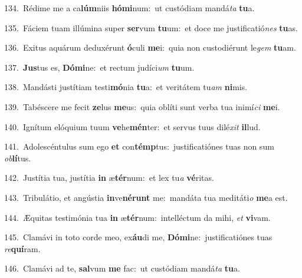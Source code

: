 {\numbfont\textcolor{\numbcolor}{134.}}~Rédime me a ca\-\textbf{lúm}\-niis \textbf{hó}\-\textbf{mi}num:~\star ut custódiam mandá\textit{ta} \textbf{tu}\-a.\par
{\numbfont\textcolor{\numbcolor}{135.}}~Fáciem tuam illúmina super \textbf{ser}\-vum \textbf{tu}\-um:~\star et doce me justificatió\textit{nes} \textbf{tu}\-as.\par
{\numbfont\textcolor{\numbcolor}{136.}}~Exitus aquárum deduxérunt \textbf{ó}\-culi \textbf{me}\-i:~\star quia non custodiérunt le\textit{gem} \textbf{tu}\-am.\par
{\numbfont\textcolor{\numbcolor}{137.}}~\-\textbf{Jus}\-tus es, \textbf{Dó}\-\textbf{mi}ne:~\star et rectum judíci\textit{um} \textbf{tu}\-um.\par
{\numbfont\textcolor{\numbcolor}{138.}}~Mandásti justítiam testi\-\textbf{mó}\-nia \textbf{tu}\-a:~\star et veritátem tu\textit{am} \textbf{ni}\-mis.\par
{\numbfont\textcolor{\numbcolor}{139.}}~Tabéscere me fecit \textbf{ze}\-lus \textbf{me}\-us:~\star quia oblíti sunt verba tua inimí\textit{ci} \textbf{me}\-i.\par
{\numbfont\textcolor{\numbcolor}{140.}}~Ignítum elóquium tuum \textbf{ve}\-he\-\textbf{mén}\-ter:~\star et servus tuus dilé\textit{xit} \textbf{il}\-lud.\par
{\numbfont\textcolor{\numbcolor}{141.}}~Adolescéntulus sum ego \textbf{et} con\-\textbf{témp}\-tus:~\star justificatiónes tuas non sum \textit{ob}\-\textbf{lí}tus.\par
{\numbfont\textcolor{\numbcolor}{142.}}~Justítia tua, justítia \textbf{in} æ\-\textbf{tér}\-num:~\star et lex tu\textit{a} \textbf{vé}\-ritas.\par
{\numbfont\textcolor{\numbcolor}{143.}}~Tribulátio, et angústia \textbf{in}\-ve\-\textbf{né}\-\textbf{runt} me:~\star mandáta tua meditáti\textit{o} \textbf{me}\-a est.\par
{\numbfont\textcolor{\numbcolor}{144.}}~Æquitas testimónia tua \textbf{in} æ\-\textbf{tér}\-num:~\star intelléctum da mihi, \textit{et} \textbf{vi}\-vam.\par
{\numbfont\textcolor{\numbcolor}{145.}}~Clamávi in toto corde meo, ex\-\textbf{áu}\-di me, \textbf{Dó}\-\textbf{mi}ne:~\star justificatiónes tuas \textit{re}\-\textbf{quí}ram.\par
{\numbfont\textcolor{\numbcolor}{146.}}~Clamávi ad te, \textbf{sal}\-vum \textbf{me} fac:~\star ut custódiam mandá\textit{ta} \textbf{tu}\-a.\par
